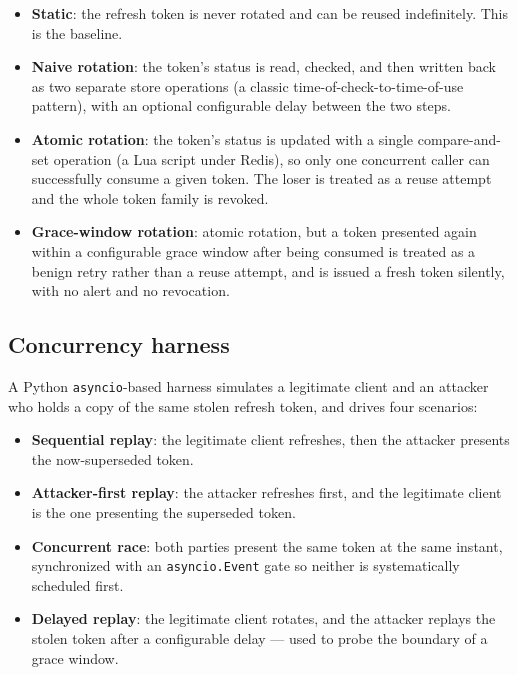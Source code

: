 \documentclass[conference]{IEEEtran}
\begin{document}
\begin{itemize}
\item \textbf{Static}: the refresh token is never rotated and can be
reused indefinitely. This is the baseline.
\item \textbf{Naive rotation}: the token's status is read, checked, and
then written back as two separate store operations (a classic
time-of-check-to-time-of-use pattern), with an optional configurable delay
between the two steps.
\item \textbf{Atomic rotation}: the token's status is updated with a
single compare-and-set operation (a Lua script under Redis), so only one
concurrent caller can successfully consume a given token. The loser is
treated as a reuse attempt and the whole token family is revoked.
\item \textbf{Grace-window rotation}: atomic rotation, but a token
presented again within a configurable grace window after being consumed is
treated as a benign retry rather than a reuse attempt, and is issued a
fresh token silently, with no alert and no revocation.
\end{itemize}

\subsection{Concurrency harness}

A Python \texttt{asyncio}-based harness simulates a legitimate client and
an attacker who holds a copy of the same stolen refresh token, and drives
four scenarios:

\begin{itemize}
\item \textbf{Sequential replay}: the legitimate client refreshes, then
the attacker presents the now-superseded token.
\item \textbf{Attacker-first replay}: the attacker refreshes first, and the
legitimate client is the one presenting the superseded token.
\item \textbf{Concurrent race}: both parties present the same token at the
same instant, synchronized with an \texttt{asyncio.Event} gate so neither
is systematically scheduled first.
\item \textbf{Delayed replay}: the legitimate client rotates, and the
attacker replays the stolen token after a configurable delay --- used to
probe the boundary of a grace window.
\end{itemize}
\end{document}
